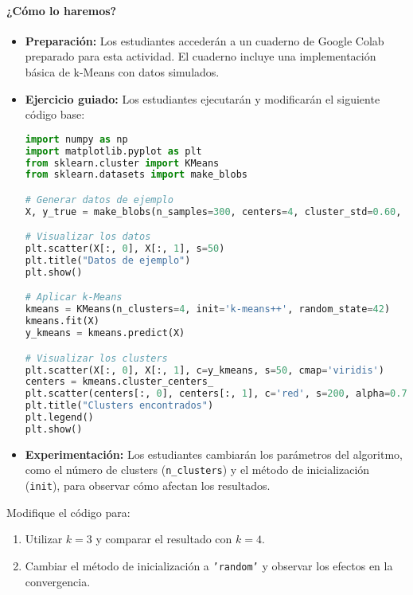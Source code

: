 \documentclass[a4,11pt]{aleph-notas}
\begin{document}
\paragraph{¿Cómo lo haremos?}  
\begin{itemize}[leftmargin=*]
    \item \textbf{Preparación:} 
    Los estudiantes accederán a un cuaderno de Google Colab preparado para esta actividad. El cuaderno incluye una implementación básica de k-Means con datos simulados.
    \item \textbf{Ejercicio guiado:}
    Los estudiantes ejecutarán y modificarán el siguiente código base:
\begin{pycodigo}
\begin{lstlisting}[language=Python]
import numpy as np
import matplotlib.pyplot as plt
from sklearn.cluster import KMeans
from sklearn.datasets import make_blobs

# Generar datos de ejemplo
X, y_true = make_blobs(n_samples=300, centers=4, cluster_std=0.60, random_state=42)

# Visualizar los datos
plt.scatter(X[:, 0], X[:, 1], s=50)
plt.title("Datos de ejemplo")
plt.show()

# Aplicar k-Means
kmeans = KMeans(n_clusters=4, init='k-means++', random_state=42)
kmeans.fit(X)
y_kmeans = kmeans.predict(X)

# Visualizar los clusters
plt.scatter(X[:, 0], X[:, 1], c=y_kmeans, s=50, cmap='viridis')
centers = kmeans.cluster_centers_
plt.scatter(centers[:, 0], centers[:, 1], c='red', s=200, alpha=0.75, label='Centroides')
plt.title("Clusters encontrados")
plt.legend()
plt.show()
\end{lstlisting}
\end{pycodigo}

    \item \textbf{Experimentación:} 
    Los estudiantes cambiarán los parámetros del algoritmo, como el número de clusters (\texttt{n\_clusters}) y el método de inicialización (\texttt{init}), para observar cómo afectan los resultados.
\end{itemize}

\begin{ejer}
Modifique el código para:
\begin{enumerate}[leftmargin=*]
    \item Utilizar \(k = 3\) y comparar el resultado con \(k = 4\).
    \item Cambiar el método de inicialización a \texttt{'random'} y observar los efectos en la convergencia.
\end{enumerate}
\end{ejer}
\end{document}
